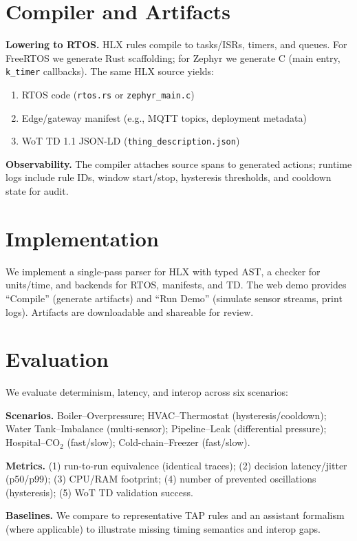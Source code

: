 \documentclass[journal]{IEEEtran}
\begin{document}
\section{Compiler and Artifacts}
\textbf{Lowering to RTOS.} HLX rules compile to tasks/ISRs, timers, and queues. For FreeRTOS we generate Rust scaffolding; for Zephyr we generate C (main entry, \texttt{k\_timer} callbacks). The same HLX source yields:
\begin{enumerate}
  \item RTOS code (\texttt{rtos.rs} or \texttt{zephyr\_main.c})
  \item Edge/gateway manifest (e.g., MQTT topics, deployment metadata)
  \item WoT TD 1.1 JSON-LD (\texttt{thing\_description.json})
\end{enumerate}

\noindent \textbf{Observability.} The compiler attaches source spans to generated actions; runtime logs include rule IDs, window start/stop, hysteresis thresholds, and cooldown state for audit.

\section{Implementation}
We implement a single-pass parser for HLX with typed AST, a checker for units/time, and backends for RTOS, manifests, and TD. The web demo provides “Compile” (generate artifacts) and “Run Demo” (simulate sensor streams, print logs). Artifacts are downloadable and shareable for review.

\section{Evaluation}
We evaluate determinism, latency, and interop across six scenarios:

\noindent\textbf{Scenarios.} Boiler–Overpressure; HVAC–Thermostat (hysteresis/cooldown); Water Tank–Imbalance (multi-sensor); Pipeline–Leak (differential pressure); Hospital–CO$_2$ (fast/slow); Cold-chain–Freezer (fast/slow).

\noindent\textbf{Metrics.} (1) run-to-run equivalence (identical traces); (2) decision latency/jitter (p50/p99); (3) CPU/RAM footprint; (4) number of prevented oscillations (hysteresis); (5) WoT TD validation success.

\noindent\textbf{Baselines.} We compare to representative TAP rules and an assistant formalism (where applicable) to illustrate missing timing semantics and interop gaps.
\end{document}

